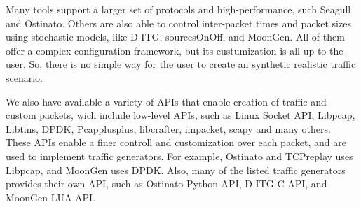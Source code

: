 Many tools support a larger set of protocols and high-performance, such Seagull and Ostinato. Others are also able to control inter-packet times and packet sizes using stochastic models, like D-ITG\cite{ditg-paper}, sourcesOnOff\cite{sourcesonoff-paper}, and MoonGen. All of them offer a complex configuration framework, but its custumization is all up to the user. So, there is no simple way for the user to create an synthetic realistic traffic scenario. 

We also have available a variety of APIs that enable creation of traffic and custom packets, wich include low-level APIs, such as Linux Socket API,  Libpcap, Libtins, DPDK, Pcapplusplus, libcrafter, impacket, scapy and many others. These APIs enable a finer controll and customization over each packet, and are used to implement traffic generators. For example, Ostinato and TCPreplay uses Libpcap, and MoonGen uses DPDK. Also, many of the listed traffic generators provides their own API, such as Ostinato Python API, D-ITG C API, and MoonGen LUA API. 




